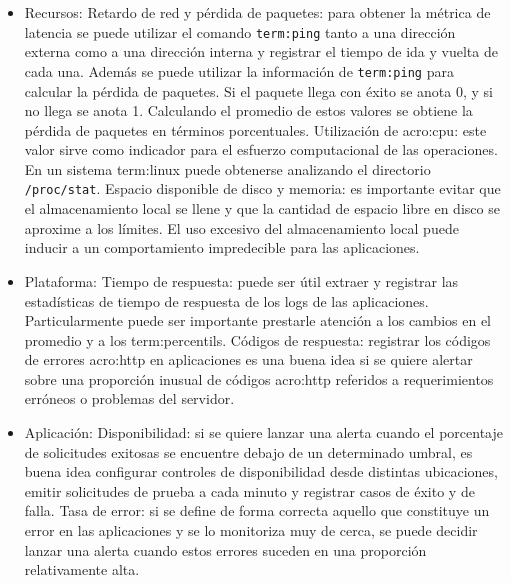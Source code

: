 \begin{itemize}
  \item Recursos:
    \subitem Retardo de red y pérdida de paquetes: para obtener la métrica de
    latencia se puede utilizar el comando \texttt{\gls{term:ping}} tanto a una
    dirección externa como a una dirección interna y registrar el tiempo de ida
    y vuelta de cada una. Además se puede utilizar la información de
    \texttt{\gls{term:ping}} para calcular la pérdida de paquetes.  Si el
    paquete llega con éxito se anota 0, y si no llega se anota 1. Calculando el
    promedio de estos valores se obtiene la pérdida de paquetes en términos
    porcentuales.
    \subitem Utilización de \gls{acro:cpu}: este valor sirve como indicador
    para el esfuerzo computacional de las operaciones. En un sistema
    \gls{term:linux} puede obtenerse analizando el directorio
    \texttt{/proc/stat}.
    \subitem Espacio disponible de disco y memoria: es importante evitar que el
    almacenamiento local se llene y que la cantidad de espacio libre en disco
    se aproxime a los límites. El uso excesivo del almacenamiento local puede
    inducir a un comportamiento impredecible para las aplicaciones.

  \item Plataforma:
    \subitem Tiempo de respuesta: puede ser útil extraer y registrar las
    estadísticas de tiempo de respuesta de los logs de las aplicaciones.
    Particularmente puede ser importante prestarle atención a los cambios en el
    promedio y a los \glspl{term:percentil}.
    \subitem Códigos de respuesta: registrar los códigos de errores
    \gls{acro:http} en aplicaciones  es una buena idea si se
    quiere alertar sobre una proporción inusual de códigos \gls{acro:http}
    referidos a requerimientos erróneos o problemas del servidor.

  \item Aplicación:
    \subitem Disponibilidad: si se quiere lanzar una alerta cuando el
    porcentaje de solicitudes exitosas se encuentre debajo de un determinado
    umbral, es buena idea configurar controles de disponibilidad desde
    distintas ubicaciones, emitir solicitudes de prueba a cada minuto y
    registrar casos de éxito y de falla.
    \subitem Tasa de error: si se define de forma correcta aquello que
    constituye un error en las aplicaciones y se lo monitoriza muy de cerca, se
    puede decidir lanzar una alerta cuando estos errores suceden en una
    proporción relativamente alta.

\end{itemize}

